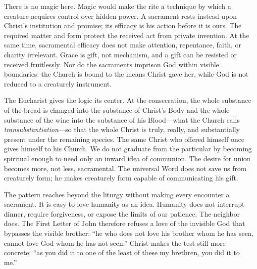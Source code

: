 There is no magic here. Magic would make the rite a technique by which a creature acquires control over hidden power. A sacrament rests instead upon Christ's institution and promise; its efficacy is his action before it is ours. The required matter and form protect the received act from private invention. At the same time, sacramental efficacy does not make attention, repentance, faith, or charity irrelevant. Grace is gift, not mechanism, and a gift can be resisted or received fruitlessly. Nor do the sacraments imprison God within visible boundaries: the Church is bound to the means Christ gave her, while God is not reduced to a creaturely instrument.

The Eucharist gives the logic its center. At the consecration, the whole substance of the bread is changed into the substance of Christ's Body and the whole substance of the wine into the substance of his Blood---what the Church calls \emph{transubstantiation}---so that the whole Christ is truly, really, and substantially present under the remaining species. The same Christ who offered himself once gives himself to his Church. We do not graduate from the particular by becoming spiritual enough to need only an inward idea of communion. The desire for union becomes more, not less, sacramental. The universal Word does not save us from creaturely form; he makes creaturely form capable of communicating his gift.

The pattern reaches beyond the liturgy without making every encounter a sacrament. It is easy to love humanity as an idea. Humanity does not interrupt dinner, require forgiveness, or expose the limits of our patience. The neighbor does. The First Letter of John therefore refuses a love of the invisible God that bypasses the visible brother: ``he who does not love his brother whom he has seen, cannot love God whom he has not seen.'' Christ makes the test still more concrete: ``as you did it to one of the least of these my brethren, you did it to me.''

